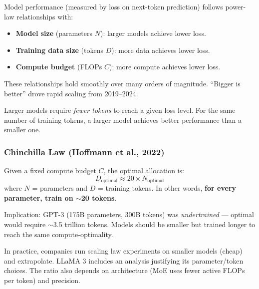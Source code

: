 \documentclass[11pt, a4paper]{article}
\begin{document}
\begin{defbox}
Model performance (measured by loss on next-token prediction) follows power-law relationships with:
\begin{itemize}[leftmargin=1.5em]
  \item \textbf{Model size} (parameters $N$): larger models achieve lower loss.
  \item \textbf{Training data size} (tokens $D$): more data achieves lower loss.
  \item \textbf{Compute budget} (FLOPs $C$): more compute achieves lower loss.
\end{itemize}
These relationships hold smoothly over many orders of magnitude. ``Bigger is better'' drove rapid scaling from 2019--2024.
\end{defbox}

\begin{defbox}
Larger models require \emph{fewer tokens} to reach a given loss level. For the same number of training tokens, a larger model achieves better performance than a smaller one.
\end{defbox}

\subsubsection{Chinchilla Law (Hoffmann et al., 2022)}

\begin{mathbox}
Given a fixed compute budget $C$, the optimal allocation is:
\[
D_{\text{optimal}} \approx 20 \times N_{\text{optimal}}
\]
where $N$ = parameters and $D$ = training tokens. In other words, \textbf{for every parameter, train on $\sim$20 tokens}.

Implication: GPT-3 (175B parameters, 300B tokens) was \emph{undertrained} --- optimal would require $\sim$3.5 trillion tokens. Models should be smaller but trained longer to reach the same compute-optimality.
\end{mathbox}

\begin{notebox}
In practice, companies run scaling law experiments on smaller models (cheap) and extrapolate. LLaMA 3 includes an analysis justifying its parameter/token choices. The ratio also depends on architecture (MoE uses fewer active FLOPs per token) and precision.
\end{notebox}
\end{document}
